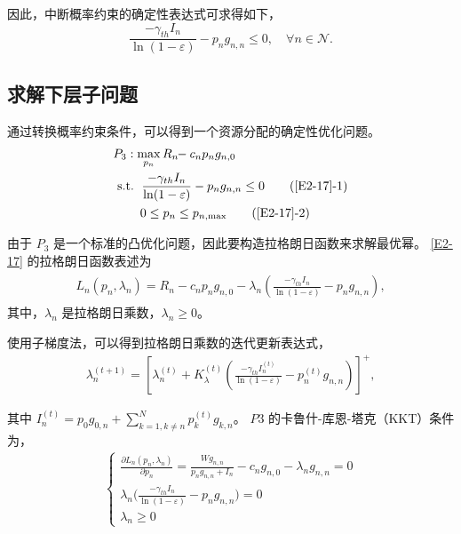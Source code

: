 因此，中断概率约束的确定性表达式可求得如下，
\begin{equation}\label{16}
\frac{-\gamma_{th} I_{n}}{\ln(1-\varepsilon)}-p_n g_{n,n}\leq0,\quad\forall n\in\mathcal{N}.
\end{equation}
\subsection{求解下层子问题}\label{section2-3-2}
通过转换概率约束条件，可以得到一个资源分配的确定性优化问题。
\begin{align}
&P_3: \max \limits_{p_{n}} R_{n}\!\!-c_{n} p_n g_{n,0}               \label{E2-17}\\
&\text { s.t. }
 \quad \!\!\!\!\! \frac{-\gamma_{th} I_{n}}{\ln(1-\varepsilon)}-p_n g_{n,n}\leq0 \tag{\ref{E2-17}{-1}} \label{E2-17-1}\\ %
& \quad \quad \quad \!\!\!\!\! 0\leq p_n\leq p_{n,\textrm{max}}                  \tag{\ref{E2-17}{-2}} \label{E2-17-2}  %
\end{align}

由于 $P_3$ 是一个标准的凸优化问题，因此要构造拉格朗日函数来求解最优幂。 \eqref{E2-17} 的拉格朗日函数表述为
\begin{eqnarray}\label{18}
\begin{array}{lll}
\textit{L}_n(p_n, \lambda_n)=R_{n}\!\!-\!\!c_{n} p_n g_{n,0}\!\!-\!\!\lambda_n \left(\frac{-\gamma_{th} I_{n}}{\ln(1-\varepsilon)}-p_n g_{n,n}\right),
\end{array}
\end{eqnarray}
其中，$\lambda_n$ 是拉格朗日乘数，$\lambda_n \geq 0$。

使用子梯度法，可以得到拉格朗日乘数的迭代更新表达式，
\begin{equation}\label{19}
\begin{array}{lll}
     \lambda_n^{(t+1)}=[\lambda_n^{(t)}\!\!+\!K_{\lambda}^{(t)}(\frac{-\gamma_{th} I_{n}^{(t)}}{\ln(1-\varepsilon)}-p_n^{(t)} g_{n,n})]^+,
\end{array}
\end{equation}

其中 $I_{n}^{(t)}=$$p_0 g_{0,n}+\sum_{k=1,k\neq n}^N p_k^{(t)} g_{k,n}$。
$P3$ 的卡鲁什-库恩-塔克（KKT）条件为，
\begin{equation}\label{20}
\begin{array}{rl}
\left\{
\begin{array}{lll}
     \frac{\partial \textit{L}_n(p_n, \lambda_n)}{\partial p_n}\!=\!\frac{W g_{n,n}}{p_n g_{n,n}+I_n}\!-\!c_n g_{n,0}\!-\!\lambda_n g_{n,n}\!=\!0\\
     \lambda_n \big(\frac{-\gamma_{th} I_{n}}{\ln(1-\varepsilon)}-p_n g_{n,n}\big)=0\\
     \lambda_n \geq 0
\end{array}
\right.
\end{array}
\end{equation}

